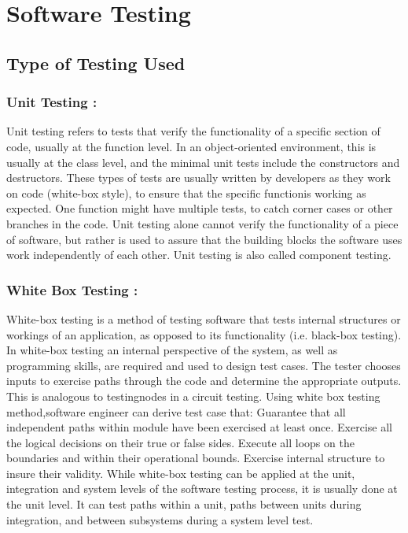 \documentclass[oneside,a4paper,12pt]{report}
\begin{document}
{%

\chapter{Software Testing}
\section{Type of Testing Used}

\subsection{Unit Testing : }
Unit testing refers to tests that verify the functionality of a specific section of code, usually at the function level. In an object-oriented environment, this is usually at the class level, and the minimal unit tests include the constructors and destructors. These types of tests are usually written by developers as they work on code (white-box style), to ensure that the specific functionis working as expected. One function might have multiple tests, to catch corner cases or other branches in the code. Unit testing alone cannot verify the functionality of a piece of software, but rather is used to assure that the building blocks the software uses work independently of each other. Unit testing is also called component testing.

\subsection{White Box Testing : }
White-box testing is a method of testing software that tests internal structures or workings of an application, as opposed to its functionality (i.e. black-box testing). In white-box testing an internal perspective of the system, as well as programming skills, are required and used to design test cases. The tester chooses inputs to exercise paths through the code and determine the appropriate outputs. This is analogous to testingnodes in a circuit testing. Using white box testing method,software engineer can derive test case that: Guarantee that all independent paths within module have been exercised at least once. Exercise all the logical decisions on their true or false sides. Execute all loops on the boundaries and within their operational bounds. Exercise internal structure to insure their validity. While white-box testing can be applied at the unit, integration and system levels of the software testing process, it is usually done at the unit level. It can test paths within a unit, paths between units during integration, and between subsystems during a system level test.

}
\end{document}
